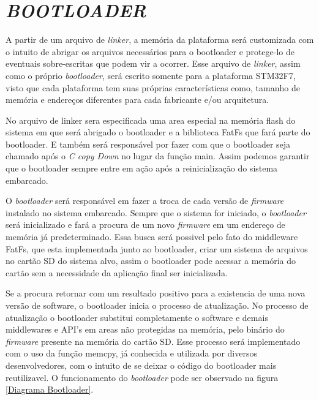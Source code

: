 

\section{\textit{BOOTLOADER}}
\label{sec:Bootloader}

A partir de um arquivo de \textit{linker}, a memória da plataforma será customizada com o intuito de abrigar os arquivos necessários para o bootloader e protege-lo de eventuais sobre-escritas que podem vir a ocorrer. Esse arquivo de \textit{linker}, assim como o próprio \textit{bootloader}, será escrito somente para a plataforma STM32F7, visto que cada plataforma tem suas próprias características como, tamanho de memória e endereços diferentes para cada fabricante e/ou arquitetura.

No arquivo de linker sera especificada uma area especial na memória flash do sistema em que será abrigado o bootloader e a biblioteca FatFs que fará parte do bootloader. E também será responsável por fazer com que o bootloader seja chamado após o \textit{C copy Down} no lugar da função main. Assim podemos garantir que o bootloader sempre entre em ação após a reinicialização do sistema embarcado.


O \textit{bootloader} será responsável em fazer a troca de cada versão de \textit{firmware} instalado no sistema embarcado. Sempre que o sistema for iniciado, o \textit{bootloader} será inicializado e fará a procura de um novo \textit{firmware} em um endereço de memória já predeterminado. Essa busca será possivel pelo fato do middleware FatFs, que esta implementada junto ao bootloader, criar um sistema de arquivos no cartão SD do sistema alvo, assim o bootloader pode acessar a memória do cartão sem a necessidade da aplicação final ser inicializada.

Se a procura retornar com um resultado positivo para a existencia de uma nova versão de software, o bootloader inicia o processo de atualização. No processo de atualização o bootloader substitui completamente o software e demais middlewares e API's em areas não protegidas na memória, pelo binário do \textit{firmware} presente na memória do cartão SD. Esse processo será implementado com o uso da  função memcpy, já conhecida e utilizada por diversos desenvolvedores, com o intuito de se deixar o código do bootloader mais reutilizavel. O funcionamento do \textit{bootloader} pode ser observado na figura \ref{Diagrama Bootloader}.

